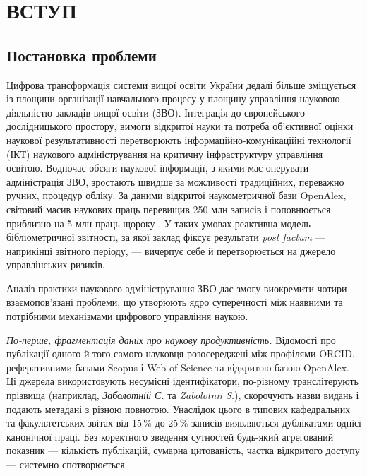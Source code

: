 \section*{ВСТУП}

\subsection*{Постановка проблеми}

Цифрова трансформація системи вищої освіти України дедалі більше зміщується із площини організації навчального процесу у площину управління науковою діяльністю закладів вищої освіти (ЗВО). Інтеграція до європейського дослідницького простору, вимоги відкритої науки та потреба об'єктивної оцінки наукової результативності перетворюють інформаційно-комунікаційні технології (ІКТ) наукового адміністрування на критичну інфраструктуру управління освітою. Водночас обсяги наукової інформації, з якими має оперувати адміністрація ЗВО, зростають швидше за можливості традиційних, переважно ручних, процедур обліку. За даними відкритої наукометричної бази OpenAlex, світовий масив наукових праць перевищив 250 млн записів і поповнюється приблизно на 5 млн праць щороку \cite{OpenAlex2024Docs}. У таких умовах реактивна модель бібліометричної звітності, за якої заклад фіксує результати \textit{post factum} --- наприкінці звітного періоду, --- вичерпує себе й перетворюється на джерело управлінських ризиків.

Аналіз практики наукового адміністрування ЗВО дає змогу виокремити чотири взаємопов'язані проблеми, що утворюють ядро суперечності між наявними та потрібними механізмами цифрового управління наукою.

\textit{По-перше, фрагментація даних про наукову продуктивність.} Відомості про публікації одного й того самого науковця розосереджені між профілями ORCID, реферативними базами Scopus і Web of Science та відкритою базою OpenAlex. Ці джерела використовують несумісні ідентифікатори, по-різному транслітерують прізвища (наприклад, \textit{Заболотній С.} та \textit{Zabolotnii S.}), скорочують назви видань і подають метадані з різною повнотою. Унаслідок цього в типових кафедральних та факультетських звітах від 15\,\% до 25\,\% записів виявляються дублікатами однієї канонічної праці. Без коректного зведення сутностей будь-який агрегований показник --- кількість публікацій, сумарна цитованість, частка відкритого доступу --- системно спотворюється.

